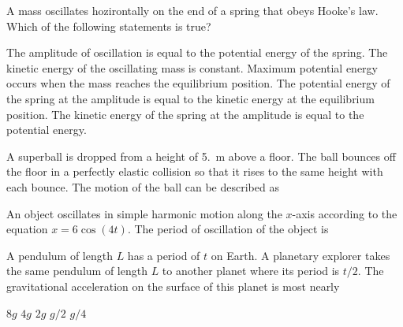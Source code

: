 \documentclass{../../oss-apphys-exam}
\begin{document}



\raggedcolumns
\begin{multicols*}{2}
  \begin{questions}
    \question A mass oscillates hozirontally on the end of a spring that obeys
    Hooke's law. Which of the following statements is true?
    \begin{choices}
      \choice The amplitude of oscillation is equal to the potential energy of
      the spring.
      \choice The kinetic energy of the oscillating mass is constant.
      \choice Maximum potential energy occurs when the mass reaches the
      equilibrium position.
      \choice The potential energy of the spring at the amplitude is equal to
      the kinetic energy at the equilibrium position.
      \choice The kinetic energy of the spring at the amplitude is equal to the
      potential energy.
    \end{choices}
    \vspace{.55in}
    
    \question A superball is dropped from a height of \SI{5.}{\metre} above a
    floor. The ball bounces off the floor in a perfectly elastic collision so
    that it rises to the same height with each bounce. The motion of the ball
    can be described as
    \vspace{.55in}
    
    \question An object oscillates in simple harmonic motion along the $x$-axis
    according to the equation $x=6\cos(4t)$. The period of oscillation of the
    object is

    \question A pendulum of length $L$ has a period of $t$ on Earth. A
    planetary explorer takes the same pendulum of length $L$ to another planet
    where its period is $t/2$. The gravitational acceleration on the surface of
    this planet is most nearly
    \begin{choices}
      \choice $8g$
      \choice $4g$
      \choice $2g$
      \choice $g/2$
      \choice $g/4$
    \end{choices}
    \columnbreak


\end{questions}
\end{multicols*}
\end{document}
